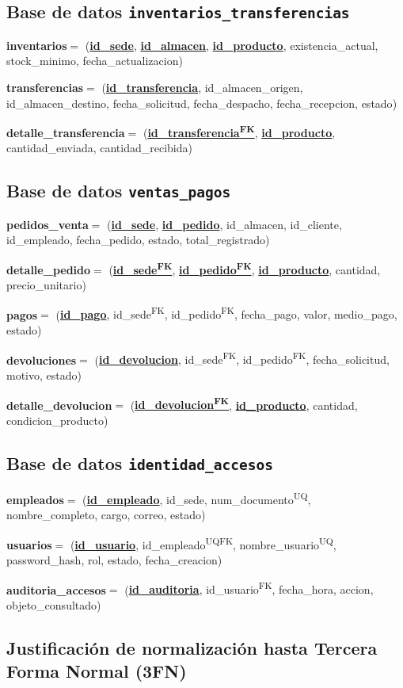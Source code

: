 \documentclass[11pt,oneside]{article}
\newcommand{\rel}[2]{%
  \par\vspace{0.28em}%
  {\raggedright\noindent
   {\ttfamily\small\bfseries\color{acento}#1}\enspace$=$%
   \enspace({\ttfamily\small #2})\par}}
\newcommand{\rpk}[1]{\underline{\textbf{#1}}}
\newcommand{\rfk}[1]{\textcolor{fk}{#1}\textsuperscript{\scriptsize\sffamily FK}}
\newcommand{\ruq}[1]{#1\textsuperscript{\scriptsize\sffamily UQ}}
\begin{document}
\subsection*{Base de datos \texttt{inventarios\_transferencias}}
\rel{inventarios}{\rpk{id\_sede}, \rpk{id\_almacen}, \rpk{id\_producto}, existencia\_actual, stock\_minimo, fecha\_actualizacion}
\rel{transferencias}{\rpk{id\_transferencia}, id\_almacen\_origen, id\_almacen\_destino, fecha\_solicitud, fecha\_despacho, fecha\_recepcion, estado}
\rel{detalle\_transferencia}{\rpk{\rfk{id\_transferencia}}, \rpk{id\_producto}, cantidad\_enviada, cantidad\_recibida}

\subsection*{Base de datos \texttt{ventas\_pagos}}
\rel{pedidos\_venta}{\rpk{id\_sede}, \rpk{id\_pedido}, id\_almacen, id\_cliente, id\_empleado, fecha\_pedido, estado, total\_registrado}
\rel{detalle\_pedido}{\rpk{\rfk{id\_sede}}, \rpk{\rfk{id\_pedido}}, \rpk{id\_producto}, cantidad, precio\_unitario}
\rel{pagos}{\rpk{id\_pago}, \rfk{id\_sede}, \rfk{id\_pedido}, fecha\_pago, valor, medio\_pago, estado}
\rel{devoluciones}{\rpk{id\_devolucion}, \rfk{id\_sede}, \rfk{id\_pedido}, fecha\_solicitud, motivo, estado}
\rel{detalle\_devolucion}{\rpk{\rfk{id\_devolucion}}, \rpk{id\_producto}, cantidad, condicion\_producto}

\subsection*{Base de datos \texttt{identidad\_accesos}}
\rel{empleados}{\rpk{id\_empleado}, id\_sede, \ruq{num\_documento}, nombre\_completo, cargo, correo, estado}
\rel{usuarios}{\rpk{id\_usuario}, \rfk{\ruq{id\_empleado}}, \ruq{nombre\_usuario}, password\_hash, rol, estado, fecha\_creacion}
\rel{auditoria\_accesos}{\rpk{id\_auditoria}, \rfk{id\_usuario}, fecha\_hora, accion, objeto\_consultado}

\subsection{Justificaci\'on de normalizaci\'on hasta Tercera Forma Normal (3FN)}
\end{document}
